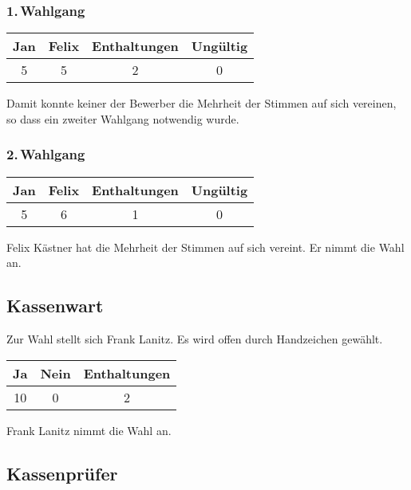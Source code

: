\documentclass{scrartcl}
\begin{document}
\subsubsection*{1.\,Wahlgang}
\begin{table}[h!]
    \centering
    \begin{tabular}{c|c|c|c}
        \textbf{Jan} & \textbf{Felix} & \textbf{Enthaltungen} &
\textbf{Ungültig} \\ \hline
        5 & 5 & 2 & 0 \\
    \end{tabular}
\end{table}

Damit konnte keiner der Bewerber die Mehrheit der Stimmen auf sich
vereinen, so dass ein zweiter Wahlgang notwendig wurde.

\subsubsection*{2.\,Wahlgang}
    \begin{table}[h!]
    \centering
    \begin{tabular}{c|c|c|c}
        \textbf{Jan} & \textbf{Felix} & \textbf{Enthaltungen} &
\textbf{Ungültig} \\ \hline
        5 & 6 & 1 & 0 \\
    \end{tabular}
\end{table}

Felix Kästner hat die Mehrheit der Stimmen auf sich vereint. Er nimmt
die Wahl an.

\subsection{Kassenwart}

Zur Wahl stellt sich Frank Lanitz. Es wird offen durch Handzeichen gewählt.

\begin{table}[h!]
    \centering
    \begin{tabular}{c|c|c}
        \textbf{Ja} & \textbf{Nein} & \textbf{Enthaltungen} \\ \hline
        10 & 0 & 2
    \end{tabular}
\end{table}

Frank Lanitz nimmt die Wahl an.

\subsection{Kassenprüfer}
\end{document}
